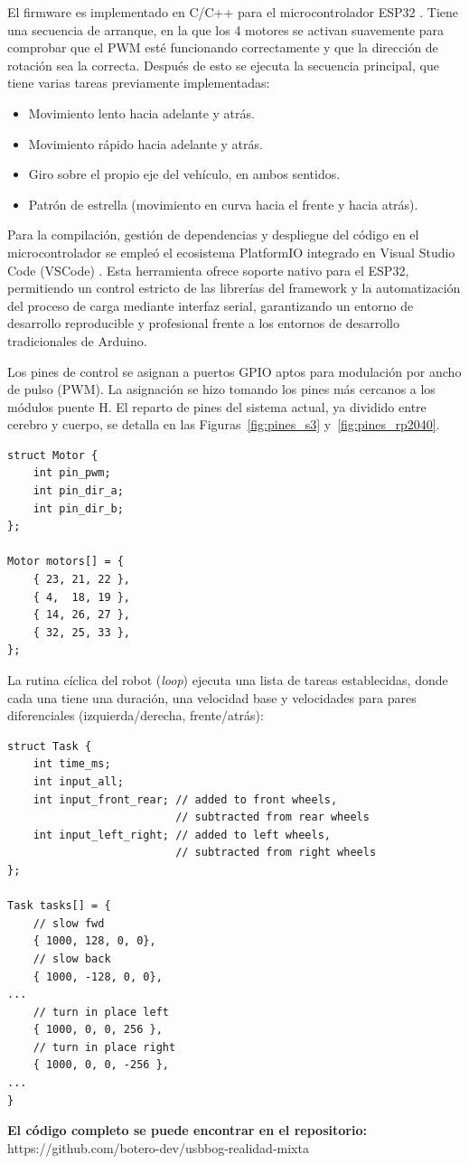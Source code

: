 \documentclass[journal]{IEEEtran}
\begin{document}
El firmware es implementado en C/C++ para el microcontrolador ESP32 \cite{esp32}. Tiene una secuencia de arranque, en la que los 4 motores se activan suavemente para comprobar que el PWM esté funcionando correctamente y que la dirección de rotación sea la correcta. Después de esto se ejecuta la secuencia principal, que tiene varias tareas previamente implementadas:
\begin{itemize}
\item Movimiento lento hacia adelante y atrás.
\item Movimiento rápido hacia adelante y atrás.
\item Giro sobre el propio eje del vehículo, en ambos sentidos.
\item Patrón de estrella (movimiento en curva hacia el frente y hacia atrás). 

\end{itemize}
Para la compilación, gestión de dependencias y despliegue del código en el microcontrolador se empleó el ecosistema PlatformIO integrado en Visual Studio Code (VSCode) \cite{platformio}. Esta herramienta ofrece soporte nativo para el ESP32, permitiendo un control estricto de las librerías del framework y la automatización del proceso de carga mediante interfaz serial, garantizando un entorno de desarrollo reproducible y profesional frente a los entornos de desarrollo tradicionales de Arduino.

Los pines de control se asignan a puertos GPIO aptos para modulación por ancho de pulso (PWM). La asignación se hizo tomando los pines más cercanos a los módulos puente H. El reparto de pines del sistema actual, ya dividido entre cerebro y cuerpo, se detalla en las Figuras~\ref{fig:pines_s3} y~\ref{fig:pines_rp2040}.

\begin{verbatim}
struct Motor {
    int pin_pwm;
    int pin_dir_a;
    int pin_dir_b;
};

Motor motors[] = {
    { 23, 21, 22 },
    { 4,  18, 19 },
    { 14, 26, 27 },
    { 32, 25, 33 },
};
\end{verbatim}

La rutina cíclica del robot (\emph{loop}) ejecuta una lista de tareas establecidas, donde cada una tiene una duración, una velocidad base y velocidades para pares diferenciales (izquierda/derecha, frente/atrás):

\begin{verbatim}
struct Task {
    int time_ms;
    int input_all;
    int input_front_rear; // added to front wheels,
                          // subtracted from rear wheels
    int input_left_right; // added to left wheels,
                          // subtracted from right wheels
};

Task tasks[] = {
    // slow fwd
    { 1000, 128, 0, 0},
    // slow back
    { 1000, -128, 0, 0},
...
    // turn in place left
    { 1000, 0, 0, 256 },
    // turn in place right
    { 1000, 0, 0, -256 },
...
}
\end{verbatim}
\textbf{El código completo se puede encontrar en el repositorio:} https://github.com/botero-dev/usbbog-realidad-mixta
\end{document}
